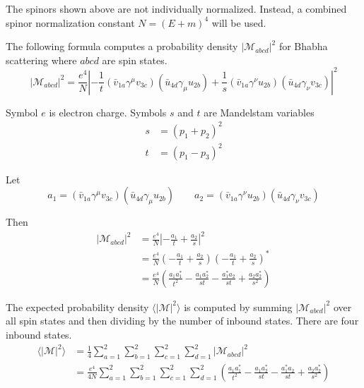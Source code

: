\documentclass[12pt]{article}
\begin{document}
\noindent
The spinors shown above are not individually normalized.
Instead, a combined spinor normalization constant $N=(E+m)^4$
will be used.

\bigskip
\noindent
The following formula computes a probability density $|\mathcal{M}_{abcd}|^2$
for Bhabha scattering where $abcd$ are spin states.
\begin{equation*}
|\mathcal{M}_{abcd}|^2=\frac{e^4}{N}
\left|
-\frac{1}{t}(\bar{v}_{1a}\gamma^\mu v_{3c})(\bar{u}_{4d}\gamma_\mu u_{2b})
+\frac{1}{s}(\bar{v}_{1a}\gamma^\nu u_{2b})(\bar{u}_{4d}\gamma_\nu v_{3c})
\right|^2
\end{equation*}

\noindent
Symbol $e$ is electron charge.
Symbols $s$ and $t$ are Mandelstam variables
\begin{align*}
s&=(p_1+p_2)^2
\\
t&=(p_1-p_3)^2
\end{align*}

\noindent
Let
\begin{equation*}
a_1=(\bar{v}_{1a}\gamma^\mu v_{3c})(\bar{u}_{4d}\gamma_\mu u_{2b})
\qquad
a_2=(\bar{v}_{1a}\gamma^\nu u_{2b})(\bar{u}_{4d}\gamma_\nu v_{3c})
\end{equation*}

\noindent
Then
\begin{align*}
|\mathcal{M}_{abcd}|^2
&=
\frac{e^4}{N}\left|{-\frac{a_1}{t}} + \frac{a_2}{s}\right|^2\\
&=
\frac{e^4}{N}\left(-\frac{a_1}{t} + \frac{a_2}{s}\right)\left(-\frac{a_1}{t} + \frac{a_2}{s}\right)^*\\
&=
\frac{e^4}{N}
\left(
\frac{a_1a_1^*}{t^2} - \frac{a_1a_2^*}{st} -
\frac{a_1^*a_2}{st} + \frac{a_2a_2^*}{s^2}
\right)
\end{align*}

\noindent
The expected probability density $\langle|\mathcal{M}|^2\rangle$ is computed
by summing $|\mathcal{M}_{abcd}|^2$ over all spin states and then dividing by the number of inbound states.
There are four inbound states.
\begin{align*}
\langle|\mathcal{M}|^2\rangle
&=
\frac{1}{4}\sum_{a=1}^2\sum_{b=1}^2\sum_{c=1}^2\sum_{d=1}^2
|\mathcal{M}_{abcd}|^2\\
&=
\frac{e^4}{4N}\sum_{a=1}^2\sum_{b=1}^2\sum_{c=1}^2\sum_{d=1}^2
\left(
\frac{a_1a_1^*}{t^2} - \frac{a_1a_2^*}{st} -
\frac{a_1^*a_2}{st} + \frac{a_2a_2^*}{s^2}
\right)
\end{align*}
\end{document}
